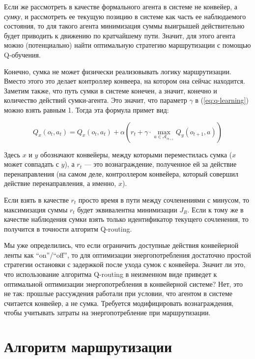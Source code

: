 \documentclass[specification,annotation,times]{itmo-student-thesis}
\theoremstyle{definition}
\begin{document}
Если же рассмотреть в качестве формального агента в системе не
конвейер, а \textit{сумку}, и рассмотреть ее текущую позицию в системе как часть
ее наблюдаемого состояния, то для такого агента минимизация суммы выигрышей
действительно будет приводить к движению по кратчайшему пути. Значит, для этого
агента можно (потенциально) найти оптимальную стратегию маршрутизации с помощью
Q-обучения.

Конечно, сумка не может физически реализовывать логику маршрутизации. Вместо
этого это делает контроллер конвеера, на котором она сейчас находится.
Заметим также, что путь сумки в системе конечен, а значит, конечно и
количество действий сумки-агента. Это значит, что параметр $\gamma$ в
(\ref{eq:q-learning}) можно взять равным 1. Тогда эта формула примет вид:

\begin{equation}
Q_x(o_t, a_t) = Q_x(o_t, a_t) + \alpha \left( r_t +
\gamma \cdot \max\limits_{a \in \mathcal{A}_{o_{t+1}}} Q_y(o_{t+1}, a) \right)
\end{equation}

Здесь $x$ и $y$ обозначают конвейеры, между которыми переместилась сумка ($x$
может совпадать с $y$),
а $r_t$ --- это вознаграждение, полученное ей за действие перенаправления (на
самом деле, контроллером конвейера, который совершил действие перенаправления, а
именно, $x$).

Если взять в качестве $r_t$ просто время в пути между сочленениями с минусом, то
максимизация суммы $r_t$ будет эквивалентна минимизации $J_R$. Если к тому же в качестве 
наблюдения сумки взять только идентификатор текущего сочленения, то получится в
точности алгоритм Q-routing.

Мы уже определились, что если ограничить доступные действия конвейерной
ленты как ``on''/``off'', то для оптимизации энергопотребления достаточно
простой стратегии остановки с задержкой после ухода сумок с конвейера.
Значит ли это, что использование алгоритма Q-routing в неизменном виде приведет
к оптимальной оптимизации энергопотребления в конвейерной системе? Нет, это не
так: прошлые рассуждения работали при условии, что агентом в системе считается
конвейер, а не сумка. Требуется модифицировать вознаграждения, чтобы учитывать
затраты на энергопотребление при маршрутизации. 

\section{Алгоритм маршрутизации}
\end{document}

